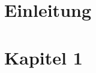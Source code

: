 \documentclass[a4paper,12pt]{article}
\title{\titel}
\author{\autor (Matr-Nr.: \matnr)}
\date{01.09.2016}
\begin{document}



\section{Einleitung}
\label{kap:Einleitung}


\section {Kapitel 1}
\label{kap:Kapitel 1}





\cleardoublepage %
{} %
\listoffigures	%
\end{document}
